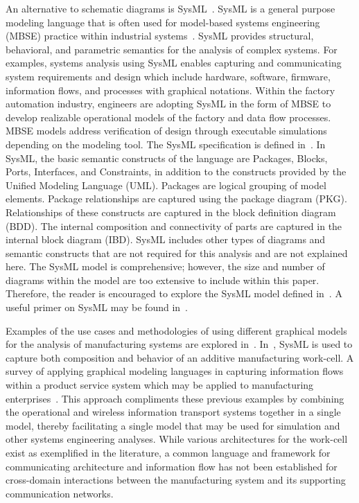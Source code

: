 An alternative to schematic diagrams is SysML~\cite{SysML2017}. SysML is a general purpose modeling language that is often used for model-based systems engineering (MBSE) practice within industrial systems~\cite{MBSEandSysML}. SysML provides structural, behavioral, and parametric semantics for the analysis of complex systems. For examples, systems analysis using SysML enables capturing and communicating system requirements and design which include hardware, software, firmware, information flows, and processes with graphical notations. Within the factory automation industry, engineers are adopting SysML in the form of MBSE to develop realizable operational models of the factory and data flow processes. MBSE models address verification of design through executable simulations depending on the modeling tool.  The SysML specification is defined in~\cite{SysML2017}.  In SysML, the basic semantic constructs of the language are Packages, Blocks, Ports, Interfaces, and Constraints, in addition to the constructs provided by the Unified Modeling Language (UML). Packages are logical grouping of model elements. Package relationships are captured using the package diagram (PKG). Relationships of these constructs are captured in the block definition diagram (BDD).  The internal composition and connectivity of parts are captured in the internal block diagram (IBD). SysML includes other types of diagrams and semantic constructs that are not required for this analysis and are not explained here. The SysML model is comprehensive; however, the size and number of diagrams within the model are too extensive to include within this paper.  Therefore, the reader is encouraged to explore the SysML model defined in~\cite{SysML.Candell2018}.  A useful primer on SysML may be found in~\cite{Friedenthal2015.SysML}. 

Examples of the use cases and methodologies of using different graphical models for the analysis of manufacturing systems are explored in~\cite{Lutjen2015.GramosaMethod,Luder2011.GraphicalModeling,Jia2013.GraphicalModeling,Alvarez2013.GraphicalModeling}.  In~\cite{Quinsat2017.SysML}, SysML is used to capture both composition and behavior of an additive manufacturing work-cell.  A survey of applying graphical modeling languages in capturing information flows within a product service system which may be applied to manufacturing enterprises~\cite{Durugbo2011.GraphicalModeling}.  This approach compliments these previous examples by combining the operational and wireless information transport systems together in a single model, thereby facilitating a single model that may be used for simulation and other systems engineering analyses.  While various architectures for the work-cell exist as exemplified in the literature, a common language and framework for communicating architecture and information flow has not been established for cross-domain interactions between the manufacturing system and its supporting communication networks.  

